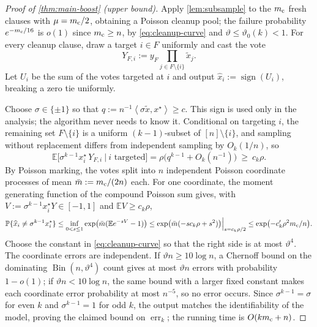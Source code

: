 \documentclass[11pt]{article}
\theoremstyle{definition}
\theoremstyle{remark}
\newcommand{\E}{\mathbb E}
\newcommand{\bbP}{\mathbb P}
\newcommand{\1}{\mathbf 1}
\newcommand{\xstar}{{x^\star}}
\newcommand{\ip}[2]{\left\langle #1,#2\right\rangle}
\DeclareMathOperator{\sign}{sign}
\DeclareMathOperator{\err}{err}
\numberwithin{equation}{section}
\begin{document}
\begin{proof}[Proof of \cref{thm:main-boost} (upper bound)]
Apply \cref{lem:subsample} to the $m_{\rm c}$ fresh clauses with
$\mu=m_{\rm c}/2$, obtaining a Poisson cleanup pool; the failure
probability $e^{-m_{\rm c}/16}$ is $o(1)$ since $m_{\rm c}\ge n$, by
\cref{eq:cleanup-curve} and $\vartheta\le\vartheta_0(k)<1$.  For
every cleanup clause, draw a target $i\in F$ uniformly and cast the vote
\begin{equation}\label{eq:targeted-vote}
 Y_{F,i}:=y_F\prod_{j\in F\setminus\{i\}}\widetilde x_j .
\end{equation}
Let $U_i$ be the sum of the votes targeted at $i$ and output
$\widehat x_i:=\sign(U_i)$, breaking a zero tie uniformly.

Choose $\sigma\in\{\pm1\}$ so that
$q:=n^{-1}\ip{\sigma\widetilde x}{\xstar}\ge c$.  This sign is used only
in the analysis; the algorithm never needs to know it.  Conditional on
targeting $i$, the remaining set
$F\setminus\{i\}$ is a uniform $(k-1)$-subset of $[n]\setminus\{i\}$,
and sampling without replacement differs from independent sampling by
$O_k(1/n)$, so
\begin{equation}\label{eq:vote-mean}
 \E\bigl[\sigma^{k-1}x_i^\star\,Y_{F,i}\ \big|\ i\text{ targeted}\bigr]
 =\rho\bigl(q^{k-1}+O_k(n^{-1})\bigr)\ \ge\ c_k\rho .
\end{equation}
By Poisson marking, the votes split into $n$ independent Poisson
coordinate processes of mean $\bar m:=m_{\rm c}/(2n)$ each.  For one
coordinate, the moment generating function of the compound Poisson sum
gives, with $V:=\sigma^{k-1}x_i^\star Y\in[-1,1]$ and $\E V\ge c_k\rho$,
\[
 \bbP\{\widehat x_i\ne\sigma^{k-1}x_i^\star\}
 \le\inf_{0<s\le1}\exp\bigl(\bar m(\E e^{-sV}-1)\bigr)
 \le\exp\bigl(\bar m(-sc_k\rho+s^2)\bigr)\Big|_{s=c_k\rho/2}
 \le\exp\bigl(-c'_k\rho^2m_{\rm c}/n\bigr).
\]
Choose the constant in \cref{eq:cleanup-curve} so that the right side is
at most $\vartheta^4$.  The coordinate errors are independent.  If
$\vartheta n\ge10\log n$, a Chernoff bound on the dominating
$\operatorname{Bin}(n,\vartheta^4)$ count gives at most $\vartheta n$
errors with probability $1-o(1)$; if $\vartheta n<10\log n$, the same
bound with a larger fixed constant makes each coordinate error
probability at most $n^{-5}$, so no error occurs.  Since
$\sigma^{k-1}=\sigma$ for even $k$ and $\sigma^{k-1}=1$ for odd $k$, the
output matches the identifiability of the model, proving the claimed
bound on $\err_k$; the running time is $O(km_{\rm c}+n)$.
\end{proof}
\end{document}
